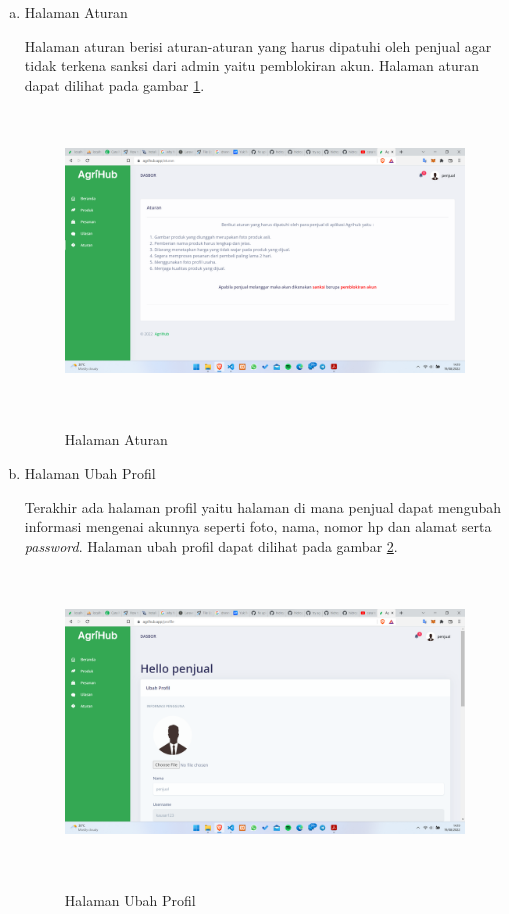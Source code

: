 \begin{enumerate}
\begin{enumerate}[a.]
		\newpage
		\item Halaman Aturan
		\par Halaman aturan berisi aturan-aturan yang harus dipatuhi oleh penjual agar tidak terkena sanksi dari admin yaitu pemblokiran akun. Halaman aturan dapat dilihat pada gambar \ref*{aturan}.
		\begin{figure}[H]
			\centering
			{\includegraphics [width = 13.5cm, height= 8cm]{gambar/penjual/aturan}}
			\caption{Halaman Aturan}
			\label{aturan}
		\end{figure}

		\item Halaman Ubah Profil
		\par Terakhir ada halaman profil yaitu halaman di mana penjual dapat mengubah informasi mengenai akunnya seperti foto, nama, nomor hp dan alamat serta \textit{password}. Halaman ubah profil dapat dilihat pada gambar \ref*{profil}.
		\begin{figure}[H]
			\centering
			{\includegraphics [width = 13.5cm, height= 8cm]{gambar/penjual/profil}}
			\caption{Halaman Ubah Profil}
			\label{profil}
		\end{figure}
	\end{enumerate}
\end{enumerate}

